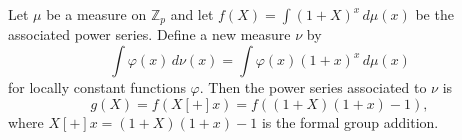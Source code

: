 Let $\mu$ be a measure on $\mathbb{Z}_p$ and let $f(X) = \int (1+X)^x \, d\mu(x)$ be the associated power series. Define a new measure $\nu$ by
$$
\int \varphi(x) \, d\nu(x) = \int \varphi(x) (1+x)^x \, d\mu(x)
$$
for locally constant functions $\varphi$. Then the power series associated to $\nu$ is
$$
g(X) = f(X [+] x) = f((1+X)(1+x) - 1),
$$
where $X [+] x = (1+X)(1+x) - 1$ is the formal group addition.
